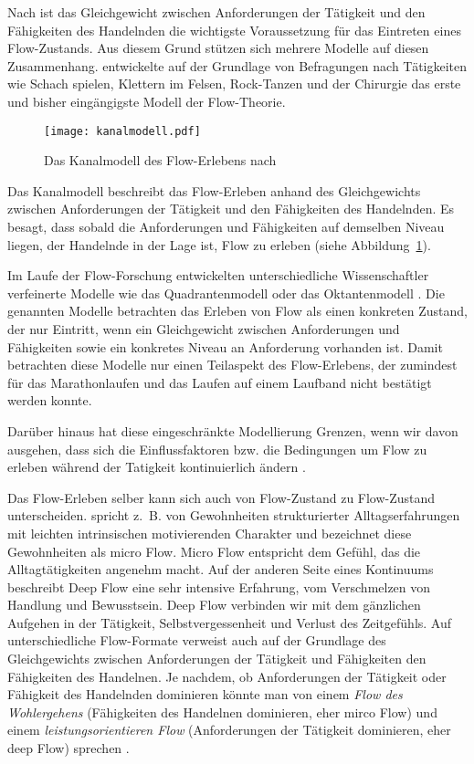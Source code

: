 Nach \citet[]{Csikszentmihalyi2010} ist das Gleichgewicht zwischen Anforderungen der Tätigkeit und den Fähigkeiten des Handelnden die wichtigste Voraussetzung für das Eintreten eines Flow-Zustands. Aus diesem Grund stützen sich mehrere Modelle auf diesen Zusammenhang. \citet[S.~75]{Csikszentmihalyi2010} entwickelte auf der Grundlage von Befragungen nach Tätigkeiten wie Schach spielen, Klettern im Felsen, Rock-Tanzen und der Chirurgie das erste und bisher eingängigste Modell der Flow-Theorie.
\begin{figure}
	[!htb] \centering 
	\texttt{[image: kanalmodell.pdf]} \caption[Das Kanalmodell des Flow-Erlebens]{Das Kanalmodell des Flow-Erlebens nach \citet[S.~75]{Csikszentmihalyi2010}} \label{fig:kanalmodell} 
\end{figure}

Das Kanalmodell beschreibt das Flow-Erleben anhand des Gleichgewichts zwischen Anforderungen der Tätigkeit und den Fähigkeiten des Handelnden. Es besagt, dass sobald die Anforderungen und Fähigkeiten auf demselben Niveau liegen, der Handelnde in der Lage ist, Flow zu erleben (siehe Abbildung~\ref{fig:kanalmodell}). 

Im Laufe der Flow-Forschung entwickelten unterschiedliche Wissenschaftler verfeinerte Modelle wie das Quadrantenmodell \citep[S.~286]{Csikszentmihalyi1995} oder das Oktantenmodell \citep[S.~296]{Massimini1995}. Die genannten Modelle betrachten das Erleben von Flow als einen konkreten Zustand, der nur Eintritt, wenn ein Gleichgewicht zwischen Anforderungen und Fähigkeiten sowie ein konkretes Niveau an Anforderung vorhanden ist. Damit betrachten diese Modelle nur einen Teilaspekt des Flow-Erlebens, der zumindest für das Marathonlaufen \citep{Stoll2005} und das Laufen auf einem Laufband \citep{Reinhardt2006} nicht bestätigt werden konnte. 

Darüber hinaus hat diese eingeschränkte Modellierung Grenzen, wenn wir davon ausgehen, dass sich die Einflussfaktoren bzw. die Bedingungen um Flow zu erleben während der Tatigkeit kontinuierlich ändern \citep[][]{Grueter2016b}.

Das Flow-Erleben selber kann sich auch von Flow-Zustand zu Flow-Zustand unterscheiden. \citet[][S.~222]{Csikszentmihalyi2010} spricht z.~B. von Gewohnheiten strukturierter Alltagserfahrungen mit leichten intrinsischen motivierenden Charakter und bezeichnet diese Gewohnheiten als micro Flow. Micro Flow entspricht dem Gefühl, das die Alltagtätigkeiten angenehm macht. Auf der anderen Seite eines Kontinuums beschreibt Deep Flow eine sehr intensive Erfahrung, vom Verschmelzen von Handlung und Bewusstsein. Deep Flow verbinden wir mit dem gänzlichen Aufgehen in der Tätigkeit, Selbstvergessenheit und Verlust des Zeitgefühls. Auf unterschiedliche Flow-Formate verweist auch \citet{Moneta2012} auf der Grundlage des Gleichgewichts zwischen Anforderungen der Tätigkeit und Fähigkeiten den Fähigkeiten des Handelnen. Je nachdem, ob Anforderungen der Tätigkeit oder Fähigkeit des Handelnden dominieren könnte man von einem \emph{Flow des Wohlergehens} (Fähigkeiten des Handelnen dominieren, eher mirco Flow) und einem \emph{leistungsorientieren Flow} (Anforderungen der Tätigkeit dominieren, eher deep Flow) sprechen \citep[][]{Grueter2016b}.

